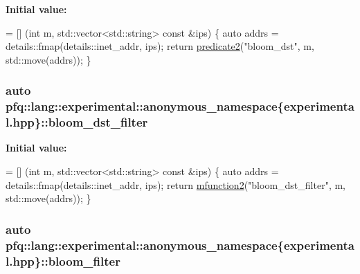 {\bfseries Initial value\+:}
\begin{DoxyCode}
= [] (\textcolor{keywordtype}{int} m, std::vector<std::string> \textcolor{keyword}{const} &ips) \{
                                \textcolor{keyword}{auto} addrs = details::fmap(details::inet\_addr, ips);
                                \textcolor{keywordflow}{return} \hyperlink{namespacepfq_1_1lang_a7282b9a2e51359b8db0dcdb9fadf2fd1}{predicate2}(\textcolor{stringliteral}{"bloom\_dst"}, m, std::move(addrs));
                          \}
\end{DoxyCode}
\hypertarget{namespacepfq_1_1lang_1_1experimental_1_1anonymous__namespace_02experimental_8hpp_03_abdc0622697144c772102af575575c07f}{
\subsubsection[{bloom\+\_\+dst\+\_\+filter}]{\setlength{\rightskip}{0pt plus 5cm}auto pfq\+::lang\+::experimental\+::anonymous\+\_\+namespace\{experimental.\+hpp\}\+::bloom\+\_\+dst\+\_\+filter}}\label{namespacepfq_1_1lang_1_1experimental_1_1anonymous__namespace_02experimental_8hpp_03_abdc0622697144c772102af575575c07f}
{\bfseries Initial value\+:}
\begin{DoxyCode}
= [] (\textcolor{keywordtype}{int} m, std::vector<std::string> \textcolor{keyword}{const} &ips) \{
                                    \textcolor{keyword}{auto} addrs = details::fmap(details::inet\_addr, ips);
                                    \textcolor{keywordflow}{return} \hyperlink{namespacepfq_1_1lang_aab1a000712bb2711044255ca1626cc84}{mfunction2}(\textcolor{stringliteral}{"bloom\_dst\_filter"}, m, std::move(addrs));
                                \}
\end{DoxyCode}
\hypertarget{namespacepfq_1_1lang_1_1experimental_1_1anonymous__namespace_02experimental_8hpp_03_ab40aacc9b6fcf65e19fb1479e96da50a}{
\subsubsection[{bloom\+\_\+filter}]{\setlength{\rightskip}{0pt plus 5cm}auto pfq\+::lang\+::experimental\+::anonymous\+\_\+namespace\{experimental.\+hpp\}\+::bloom\+\_\+filter}}\label{namespacepfq_1_1lang_1_1experimental_1_1anonymous__namespace_02experimental_8hpp_03_ab40aacc9b6fcf65e19fb1479e96da50a}
